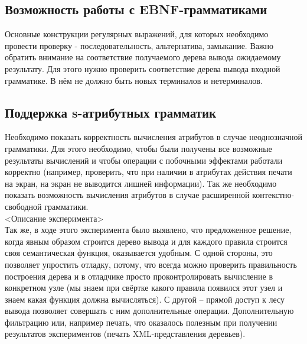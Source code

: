 \subsection{Возможность работы с EBNF-грамматиками} 

Основные конструкции регулярных выражений, для которых необходимо провести проверку - последовательность, альтернатива, замыкание. Важно обратить внимание на соответствие получаемого дерева вывода ожидаемому результату. Для этого нужно проверить соответствие дерева вывода входной грамматике. В нём не должно быть новых терминалов и нетерминалов.
	


\subsection{Поддержка s-атрибутных грамматик}

 Необходимо показать корректность вычисления атрибутов в случае неоднозначной грамматики. Для этого необходимо, чтобы были получены все возможные результаты вычислений и чтобы операции с побочными эффектами работали корректно (например, проверить, что при наличии в атрибутах действия печати на экран, на экран  не выводится лишней информации). Так же необходимо показать возможность вычисления атрибутов в случае расширенной контекстно-свободной  грамматики. 
\\
<Описание эксперимента>
\\

Так же, в ходе этого эксперимента было выявлено, что предложенное решение, когда явным образом строится дерево вывода и для каждого правила строится своя семантическая функция, оказывается удобным. С одной стороны, это позволяет упростить отладку, потому, что всегда можно проверить правильность построения дерева и в отладчике просто проконтролировать вычисление в конкретном узле (мы знаем при свёртке какого правила появился этот узел и знаем какая функция должна вычисляться). С другой -- прямой доступ к лесу вывода позволяет совершать с ним дополнительные операции.  Дополнительную фильтрацию или, например печать, что оказалось полезным при получении результатов экспериментов (печать XML-представления деревьев). 
